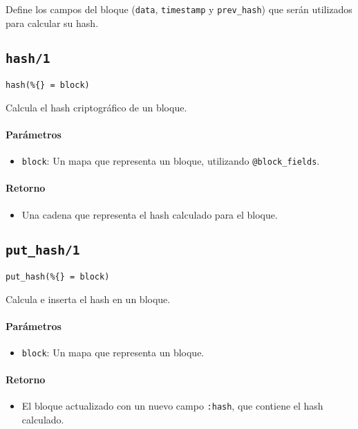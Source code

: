 {Define los campos del bloque (\texttt{data}, \texttt{timestamp} y \texttt{prev\_hash}) que serán utilizados para calcular su hash.

\subsection*{\texttt{hash/1}}
\begin{verbatim}
hash(%{} = block)
\end{verbatim}

Calcula el hash criptográfico de un bloque.

\paragraph{Parámetros}
\begin{itemize}
    \item \texttt{block}: Un mapa que representa un bloque, utilizando \texttt{@block\_fields}.
\end{itemize}

\paragraph{Retorno}
\begin{itemize}
    \item Una cadena que representa el hash calculado para el bloque.
\end{itemize}


\subsection*{\texttt{put\_hash/1}}
\begin{verbatim}
put_hash(%{} = block)
\end{verbatim}

Calcula e inserta el hash en un bloque.

\paragraph{Parámetros}
\begin{itemize}
    \item \texttt{block}: Un mapa que representa un bloque.
\end{itemize}

\paragraph{Retorno}
\begin{itemize}
    \item El bloque actualizado con un nuevo campo \texttt{:hash}, que contiene el hash calculado.
\end{itemize}

}
